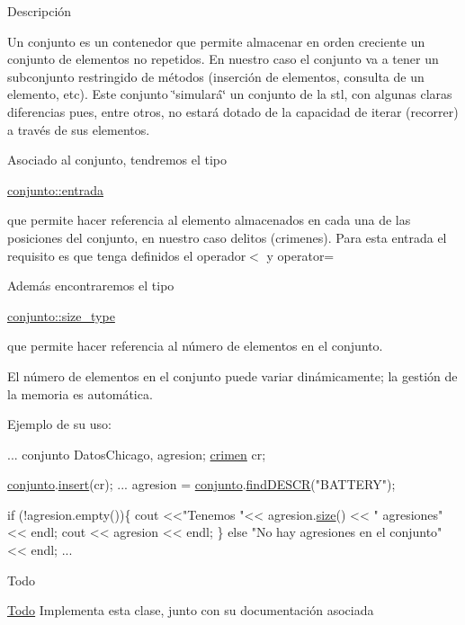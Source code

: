 Descripción

Un conjunto es un contenedor que permite almacenar en orden creciente un conjunto de elementos no repetidos. En nuestro caso el conjunto va a tener un subconjunto restringido de métodos (inserción de elementos, consulta de un elemento, etc). Este conjunto \char`\"{}simulará\char`\"{} un conjunto de la stl, con algunas claras diferencias pues, entre otros, no estará dotado de la capacidad de iterar (recorrer) a través de sus elementos.

Asociado al conjunto, tendremos el tipo
\begin{DoxyCode}
\hyperlink{classcrimen}{conjunto::entrada} 
\end{DoxyCode}
 que permite hacer referencia al elemento almacenados en cada una de las posiciones del conjunto, en nuestro caso delitos (crimenes). Para esta entrada el requisito es que tenga definidos el operador$<$ y operator=

Además encontraremos el tipo
\begin{DoxyCode}
\hyperlink{classconjunto_a0cc9902da62790ec2a6d59f4559c2df5}{conjunto::size\_type} 
\end{DoxyCode}
 que permite hacer referencia al número de elementos en el conjunto.

El número de elementos en el conjunto puede variar dinámicamente; la gestión de la memoria es automática.

Ejemplo de su uso\-: 
\begin{DoxyCode}
...
conjunto DatosChicago, agresion;
\hyperlink{classcrimen}{crimen} cr;

\hyperlink{classconjunto}{conjunto}.\hyperlink{classconjunto_a61c22092268cc91439b93a2fd96e4173}{insert}(cr);
...
agresion = \hyperlink{classconjunto}{conjunto}.\hyperlink{classconjunto_ab4f2fdce330e5b53c3ac8f529ccd435d}{findDESCR}(\textcolor{stringliteral}{"BATTERY"});

\textcolor{keywordflow}{if} (!agresion.empty())\{
 cout <<\textcolor{stringliteral}{"Tenemos "}<< agresion.\hyperlink{classconjunto_aa2d78be0b9fd7aecf1fccf9ad502b907}{size}() << \textcolor{stringliteral}{" agresiones"} << endl;
 cout << agresion << endl;
\} \textcolor{keywordflow}{else} \textcolor{stringliteral}{"No hay agresiones en el conjunto"} << endl;
...
\end{DoxyCode}
 \begin{DoxyRefDesc}{Todo}
\item[\hyperlink{todo__todo000002}{Todo}]Implementa esta clase, junto con su documentación asociada \end{DoxyRefDesc}


